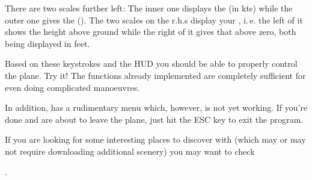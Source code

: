There are two scales further left: The inner one displays the
 (in kts) while the outer one gives the
 (). The two scales
on the r.h.s display your , i.\,e. the left of it
shows the height above ground while the right of it gives that
above zero, both being displayed in feet.

Based on these keystrokes and the HUD you should be able to
properly control the plane. Try it! The functions already
implemented are completely sufficient for even doing complicated
manoeuvres.

In addition, \FlightGear has a rudimentary menu which, however, is
not yet working. If you're done and are about to leave the plane,
just hit the ESC key to exit the program.

If you are looking for some interesting places to discover with
\FlightGear (which may or may not require downloading additional
scenery) you may want to check

 .

